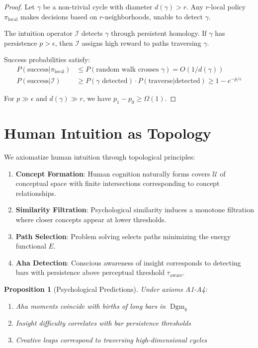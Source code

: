 \documentclass[11pt]{article}
\newtheorem{proposition}{Proposition}[section]
\DeclareMathOperator{\Dgm}{Dgm}
\begin{document}
\begin{proof}
Let $\gamma$ be a non-trivial cycle with diameter $d(\gamma) > r$. Any $r$-local policy $\pi_{\text{local}}$ makes decisions based on $r$-neighborhoods, unable to detect $\gamma$.

The intuition operator $\mathcal{I}$ detects $\gamma$ through persistent homology. If $\gamma$ has persistence $p > \epsilon$, then $\mathcal{I}$ assigns high reward to paths traversing $\gamma$.

Success probabilities satisfy:
\begin{align}
P(\text{success} | \pi_{\text{local}}) &\leq P(\text{random walk crosses } \gamma) = O(1/d(\gamma)) \\
P(\text{success} | \mathcal{I}) &\geq P(\gamma \text{ detected}) \cdot P(\text{traverse} | \text{detected}) \geq 1 - e^{-p/\epsilon}
\end{align}

For $p \gg \epsilon$ and $d(\gamma) \gg r$, we have $p_1 - p_0 \geq \Omega(1)$.
\end{proof}

\section{Human Intuition as Topology}

We axiomatize human intuition through topological principles:

\begin{enumerate}[label=A\arabic*]
    \item \textbf{Concept Formation}: Human cognition naturally forms covers $\mathcal{U}$ of conceptual space with finite intersections corresponding to concept relationships.
    \item \textbf{Similarity Filtration}: Psychological similarity induces a monotone filtration where closer concepts appear at lower thresholds.
    \item \textbf{Path Selection}: Problem solving selects paths minimizing the energy functional $E$.
    \item \textbf{Aha Detection}: Conscious awareness of insight corresponds to detecting bars with persistence above perceptual threshold $\tau_{\text{aware}}$.
\end{enumerate}

\begin{proposition}[Psychological Predictions]
Under axioms A1-A4:
\begin{enumerate}
    \item Aha moments coincide with births of long bars in $\Dgm_k$
    \item Insight difficulty correlates with bar persistence thresholds
    \item Creative leaps correspond to traversing high-dimensional cycles
\end{enumerate}
\end{proposition}
\end{document}
